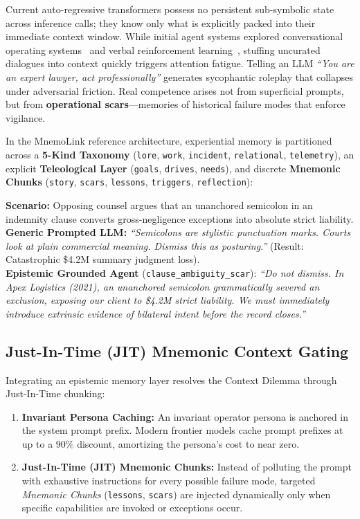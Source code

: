 Current auto-regressive transformers possess no persistent sub-symbolic state across inference calls; they know only what is explicitly packed into their immediate context window. While initial agent systems explored conversational operating systems~\cite{packer2023memgpt, mei2024aios} and verbal reinforcement learning~\cite{shinn2023reflexion}, stuffing uncurated dialogues into context quickly triggers attention fatigue. Telling an LLM \emph{``You are an expert lawyer, act professionally''} generates sycophantic roleplay that collapses under adversarial friction. Real competence arises not from superficial prompts, but from \textbf{operational scars}---memories of historical failure modes that enforce vigilance.

In the MnemoLink reference architecture, experiential memory is partitioned across a \textbf{5-Kind Taxonomy} (\texttt{lore}, \texttt{work}, \texttt{incident}, \texttt{relational}, \texttt{telemetry}), an explicit \textbf{Teleological Layer} (\texttt{goals}, \texttt{drives}, \texttt{needs}), and discrete \textbf{Mnemonic Chunks} (\texttt{story}, \texttt{scars}, \texttt{lessons}, \texttt{triggers}, \texttt{reflection}):

\begin{tcolorbox}[protocolbox, title={CASE STUDY: THE SEMICOLON TRAP}]
\textbf{Scenario:} Opposing counsel argues that an unanchored semicolon in an indemnity clause converts gross-negligence exceptions into absolute strict liability.\\[0.2em]
\textbf{Generic Prompted LLM:} \emph{``Semicolons are stylistic punctuation marks. Courts look at plain commercial meaning. Dismiss this as posturing.''} (Result: Catastrophic \$4.2M summary judgment loss).\\[0.2em]
\textbf{Epistemic Grounded Agent} (\texttt{clause\_ambiguity\_scar}): \emph{``Do not dismiss. In Apex Logistics (2021), an unanchored semicolon grammatically severed an exclusion, exposing our client to \$4.2M strict liability. We must immediately introduce extrinsic evidence of bilateral intent before the record closes.''}
\end{tcolorbox}

\subsection{Just-In-Time (JIT) Mnemonic Context Gating}
\label{subsec:mnemolink_jit}

Integrating an epistemic memory layer resolves the Context Dilemma through Just-In-Time chunking:
\begin{enumerate}[leftmargin=*]
  \item \textbf{Invariant Persona Caching:} An invariant operator persona is anchored in the system prompt prefix. Modern frontier models cache prompt prefixes at up to a $90\%$ discount, amortizing the persona's cost to near zero.
  \item \textbf{Just-In-Time (JIT) Mnemonic Chunks:} Instead of polluting the prompt with exhaustive instructions for every possible failure mode, targeted \emph{Mnemonic Chunks} (\texttt{lessons}, \texttt{scars}) are injected dynamically only when specific capabilities are invoked or exceptions occur.
\end{enumerate}

